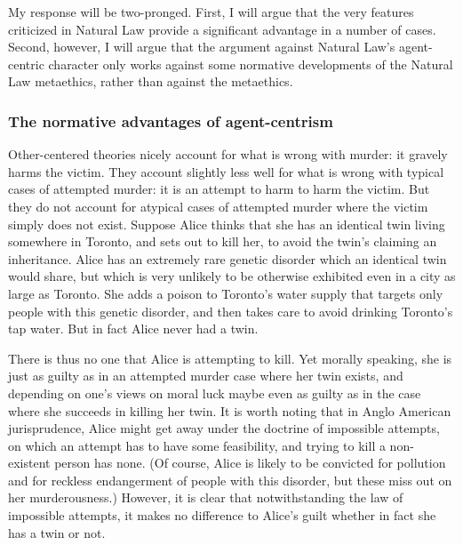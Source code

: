 My response will be two-pronged. First, I will argue that the very features criticized in Natural Law provide a significant advantage
in a number of cases. Second, however, I will argue that the argument against Natural Law's agent-centric character only works
against some normative developments of the Natural Law metaethics, rather than against the metaethics. 

\subsubsection{The normative advantages of agent-centrism}
Other-centered theories nicely account for what is wrong with murder: it gravely harms the victim. They account slightly less well 
for what is wrong with typical cases of attempted murder: it is an attempt to harm to harm the victim. But they do not account for
atypical cases of attempted murder where the victim simply does not exist. Suppose Alice thinks that she has an identical twin 
living somewhere in Toronto, and sets out to kill her, to avoid the twin's claiming an inheritance. Alice has an extremely rare
genetic disorder which an identical twin would share, but which is very unlikely to be otherwise exhibited even in a city as large as
Toronto. She adds a poison to Toronto's water supply that targets only people with this genetic disorder, and then takes care to avoid
drinking Toronto's tap water. But in fact Alice never had a twin. 

There is thus no one that Alice is attempting to kill. Yet morally speaking, she is just as guilty as in an attempted murder case 
where her twin exists, and depending on one's views on moral luck maybe even as guilty as in the case where she succeeds in killing 
her twin. It is worth noting that in Anglo American jurisprudence, Alice might get away under the doctrine of impossible attempts,
on which an attempt has to have some feasibility, and trying to kill a non-existent person has none. (Of course, Alice is likely to be
convicted for pollution and for reckless endangerment of people with this disorder, but these miss out on her murderousness.) However, it is clear 
that notwithstanding the law of impossible attempts, it makes no difference to Alice's guilt whether in fact she has a twin or not.

